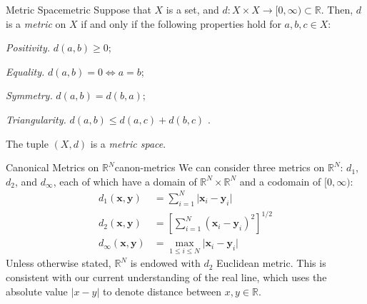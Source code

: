 \documentclass{article}
\renewcommand*\vec{\mathbf}
\numberwithin{equation}{section}
\numberwithin{figure}{section}
\newcommand*\setaxiomprefix[1]{
    \setlist[axioms]{label=#1\arabic*), ref=#1\arabic*}
}
\begin{document}
\begin{definition}{Metric Space}{metric}
    Suppose that $ X $ is a set, and $ d \colon X \times X \to [0, \infty)
    \subset \mathbb{R} $. Then, $ d $ is a \emph{metric} on $ X $ if and only if
    the following properties hold for $ a, b, c \in X $:
    \setaxiomprefix{M}
    \begin{axioms}
        \item \emph{Positivity.} $ d(a, b) \geq 0 $;
        \item \emph{Equality.} $ d(a, b) = 0 \iff a = b $;
        \item \emph{Symmetry.} $ d(a, b) = d(b, a) $;
        \item \emph{Triangularity.} $ d(a, b) \leq d(a, c) + d(b, c) $
            \label{axiom:triangle-inequality}.
    \end{axioms}
    The tuple $ (X, d) $ is a \emph{metric space}.
\end{definition}
\begin{definition}{Canonical Metrics on \texorpdfstring{$\mathbb{R}^N$}{an
        N-dimensional real vector space}}{canon-metrics}
    We can consider three metrics on $ \mathbb{R}^N $: $ d_1 $, $ d_2 $, and
    $ d_\infty $, each of which have a domain of $ \mathbb{R}^N \times
    \mathbb{R}^N $ and a codomain of $ [0, \infty) $:
    \begin{align}
        d_1(\vec{x}, \vec{y}) &= \sum_{i=1}^N \vert \vec{x}_i - \vec{y}_i
            \vert\label{eqn:d1-metric} \\
        d_2(\vec{x}, \vec{y}) &= \left[\sum_{i=1}^N (\vec{x}_i - \vec{y}_i)^2
            \right]^{1/2} \label{eqn:d2-metric} \\[.8em]
        d_\infty(\vec{x}, \vec{y}) &= \max_{1 \leq i \leq N} \vert \vec{x}_i -
            \vec{y}_i \vert\label{eqn:dinf-metric}
    \end{align}
    Unless otherwise stated, $ \mathbb{R}^N $ is endowed with $ d_2 $ Euclidean
    metric. This is consistent with our current understanding of the real line,
    which uses the absolute value $ \vert x - y \vert $ to denote distance
    between $ x, y \in \mathbb{R} $.
\end{definition}
\end{document}
